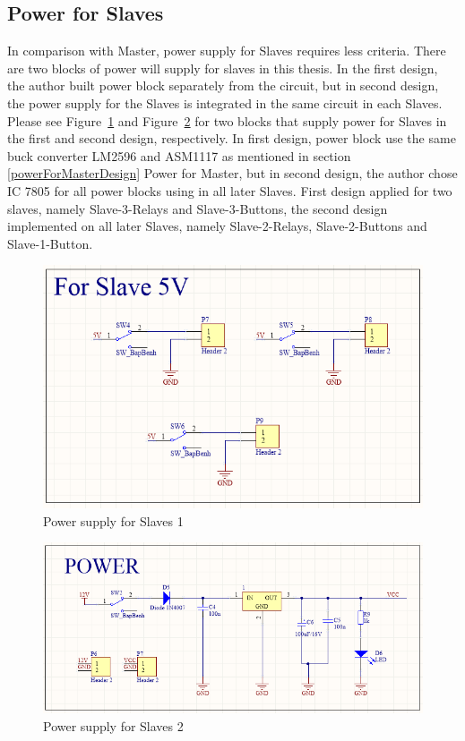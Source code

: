     \subsection{Power for Slaves}
    In comparison with Master, power supply for Slaves requires less criteria. There are two blocks of power will supply for slaves in this thesis. In the first design, the author built power block separately from the circuit, but in second design, the power supply for the Slaves is integrated in the same circuit in each Slaves. Please see Figure~\ref{fig:powerForSlave1} and Figure~\ref{fig:powerForSlave2} for two blocks that supply power for Slaves in the first and second design, respectively. In first design, power block use the same buck converter LM2596 and ASM1117 as mentioned in section \ref{powerForMasterDesign} Power for Master, but in second design, the author chose IC 7805 for all power blocks using in all later Slaves. First design applied for two slaves, namely Slave-3-Relays and Slave-3-Buttons, the second design implemented on all later Slaves, namely Slave-2-Relays, Slave-2-Buttons and Slave-1-Button.
    \begin{figure}[!ht]
        \begin{center}
        \includegraphics[scale=0.8]{images/powerForSlave1.png}
        \caption{Power supply for Slaves 1}
        \label{fig:powerForSlave1}
        \end{center}
    \end{figure}
    \begin{figure}[!ht]
        \begin{center}
        \includegraphics[scale=0.8]{images/powerForSlave2.png}
        \caption{Power supply for Slaves 2}
        \label{fig:powerForSlave2}
        \end{center}
    \end{figure}


